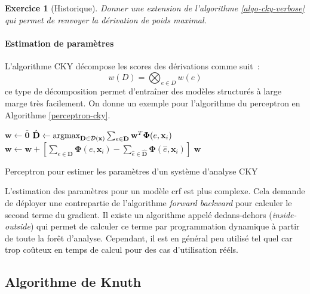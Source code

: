 \documentclass[11pt,openany]{book}
\newtheorem{exo}{Exercice}[chapter]
\begin{document}
\begin{exo}[Historique]
Donner une extension de l'algorithme \ref{algo-cky-verbose} qui permet de renvoyer la dérivation de poids maximal.
\end{exo}


\paragraph{Estimation de paramètres}
L'algorithme CKY décompose les scores des dérivations comme suit~:
\begin{equation}
w(D) = \bigotimes_{e\in D} w(e) 
\end{equation}
ce type de décomposition permet d'entraîner des modèles structurés à large marge très facilement.
On donne un exemple pour l'algorithme du perceptron en Algorithme \ref{perceptron-cky}.

\begin{algorithm}[htbp]
\begin{algorithmic}[1]
\State $\mathbf{w} \gets \bar{\mathbf{0}}$
\State
$\hat{\mathbf{D}} \gets \mathop{\text{argmax}}_{\mathbf{D}\in
  \mathbf{\cal D}(\mathbf{x})} 
\sum_{e\in \mathbf{D}} \mathbf{w}^T \boldsymbol\Phi(e,\mathbf{x}_i)$
     \State $\mathbf{w} \gets  \mathbf{w} +
     \left[ \sum_{e\in \mathbf{D}} \boldsymbol\Phi(e,\mathbf{x}_i) 
       - \sum_{\hat{e} \in \hat{\mathbf{D}}} \boldsymbol\Phi(\hat{e},\mathbf{x}_i)   \right]$ 
\EndIf
\EndFor
\EndFor
\State \Return $\mathbf{w}$
\EndFunction
\end{algorithmic}
\caption{\label{perceptron-cky}Perceptron pour estimer les paramètres d'un système d'analyse
  CKY}
\end{algorithm}

L'estimation des paramètres pour un modèle {\sc crf} est plus complexe. 
Cela demande de déployer une contrepartie de l'algorithme
{\em forward backward} pour calculer le second terme du gradient. Il existe un algorithme appelé dedans-dehors
({\em inside-outside}) qui permet de calculer ce terme par programmation dynamique à partir de toute la forêt d'analyse. 
Cependant, il est en général peu utilisé tel quel car trop coûteux en temps de calcul pour des cas d'utilisation rééls. 



\subsection{Algorithme de Knuth}
\end{document}
